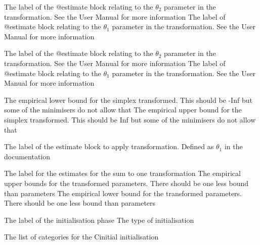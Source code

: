  {The label of the @estimate block relating to the $\theta_2$ parameter in the transformation. See the User Manual for more information}
 {The label of @estimate block relating to the $\theta_1$ parameter in the transformation. See the User Manual for more information}
\par\textbf{}\par
{} {The label of the @estimate block relating to the $\theta_2$ parameter in the transformation. See the User Manual for more information}
 {The label of @estimate block relating to the $\theta_1$ parameter in the transformation. See the User Manual for more information}
\par\textbf{}\par
{} {The empirical lower bound for the simplex transformed. This should be -Inf but some of the minimisers do not allow that}
 {The empirical upper bound for the simplex transformed. This should be Inf but some of the minimisers do not allow that}
\par\textbf{}\par
{} {The label of the estimate block to apply transformation. Defined as $\theta_1$ in the documentation}
\par\textbf{}\par
{} {The label for the estimates for the sum to one transformation}
 {The empirical upper bounds for the transformed parameters. There should be one less bound than parameters}
 {The empirical lower bound for the transformed parameters. There should be one less bound than parameters}
\par\par
{} {The label of the initialisation phase}
 {The type of initialisation}
\par\textbf{}\par
{} {The list of categories for the Cinitial initialisation}
\par\textbf{}\par
